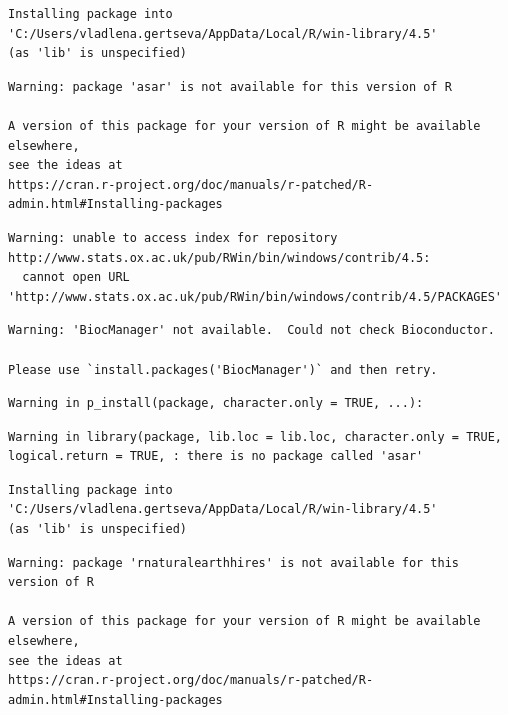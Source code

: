 \documentclass[
]{scrartcl}
\renewcommand*\contentsname{Table of contents}
\newcommand\contentsname{Table of contents}
\begin{document}
\renewcommand*\contentsname{Table of contents}
{
\hypersetup{linkcolor=}
\setcounter{tocdepth}{3}
\tableofcontents
}

\begin{verbatim}
Installing package into 'C:/Users/vladlena.gertseva/AppData/Local/R/win-library/4.5'
(as 'lib' is unspecified)
\end{verbatim}

\begin{verbatim}
Warning: package 'asar' is not available for this version of R

A version of this package for your version of R might be available elsewhere,
see the ideas at
https://cran.r-project.org/doc/manuals/r-patched/R-admin.html#Installing-packages
\end{verbatim}

\begin{verbatim}
Warning: unable to access index for repository http://www.stats.ox.ac.uk/pub/RWin/bin/windows/contrib/4.5:
  cannot open URL 'http://www.stats.ox.ac.uk/pub/RWin/bin/windows/contrib/4.5/PACKAGES'
\end{verbatim}

\begin{verbatim}
Warning: 'BiocManager' not available.  Could not check Bioconductor.

Please use `install.packages('BiocManager')` and then retry.
\end{verbatim}

\begin{verbatim}
Warning in p_install(package, character.only = TRUE, ...):
\end{verbatim}

\begin{verbatim}
Warning in library(package, lib.loc = lib.loc, character.only = TRUE,
logical.return = TRUE, : there is no package called 'asar'
\end{verbatim}

\begin{verbatim}
Installing package into 'C:/Users/vladlena.gertseva/AppData/Local/R/win-library/4.5'
(as 'lib' is unspecified)
\end{verbatim}

\begin{verbatim}
Warning: package 'rnaturalearthhires' is not available for this version of R

A version of this package for your version of R might be available elsewhere,
see the ideas at
https://cran.r-project.org/doc/manuals/r-patched/R-admin.html#Installing-packages
\end{verbatim}
\end{document}

